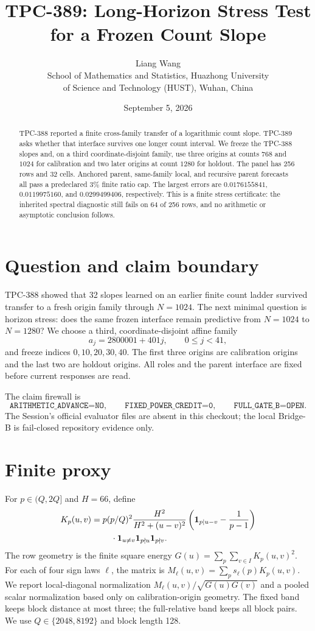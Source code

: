 \documentclass[10pt]{article}
\title{TPC-389: Long-Horizon Stress Test for a Frozen Count Slope}
\author{Liang Wang\\
School of Mathematics and Statistics, Huazhong University\\
of Science and Technology (HUST), Wuhan, China}
\date{September 5, 2026}
\begin{document}
\maketitle

\begin{abstract}
TPC-388 reported a finite cross-family transfer of a logarithmic count slope.
TPC-389 asks whether that interface survives one longer count interval.  We
freeze the TPC-388 slopes and, on a third coordinate-disjoint family, use
three origins at counts $768$ and $1024$ for calibration and two later origins
at count $1280$ for holdout.  The panel has 256 rows and 32 cells.  Anchored
parent, same-family local, and recursive parent forecasts all pass a
predeclared 3\% finite ratio cap.  The largest errors are
$0.0176155841$, $0.0119975160$, and $0.0299499406$, respectively.  This is a
finite stress certificate: the inherited spectral diagnostic still fails on
64 of 256 rows, and no arithmetic or asymptotic conclusion follows.
\end{abstract}

\section{Question and claim boundary}

TPC-388 showed that 32 slopes learned on an earlier finite count ladder
survived transfer to a fresh origin family through $N=1024$.  The next minimal
question is horizon stress: does the same frozen interface remain predictive
from $N=1024$ to $N=1280$?  We choose a third, coordinate-disjoint affine
family
\[
 a_j=2800001+401j,\qquad 0\leq j<41,
\]
and freeze indices $0,10,20,30,40$.  The first three origins are calibration
origins and the last two are holdout origins.  All roles and the parent
interface are fixed before current responses are read.

The claim firewall is
\[
 \texttt{ARITHMETIC\_ADVANCE=NO},\qquad
 \texttt{FIXED\_POWER\_CREDIT=0},\qquad
 \texttt{FULL\_GATE\_B=OPEN}.
\]
The Session's official evaluator files are absent in this checkout; the local
Bridge-B is fail-closed repository evidence only.

\section{Finite proxy}

For $p\in(Q,2Q]$ and $H=66$, define
\begin{align*}
 K_p(u,v)={}&p(p/Q)^2\frac{H^2}{H^2+(u-v)^2}
 \left({\bf 1}_{p\mid u-v}-\frac{1}{p-1}\right)\\
 &\quad\cdot{\bf 1}_{u\ne v}{\bf 1}_{p\nmid u}{\bf 1}_{p\nmid v}.
\end{align*}
The row geometry is the finite square energy
$G(u)=\sum_{p}\sum_{v\in I}K_p(u,v)^2$.  For each of four sign laws
$\ell$, the matrix is $M_\ell(u,v)=\sum_p s_\ell(p)K_p(u,v)$.  We report
local-diagonal normalization
$M_\ell(u,v)/\sqrt{G(u)G(v)}$ and a pooled scalar normalization based only on
calibration-origin geometry.  The fixed band keeps block distance at most
three; the full-relative band keeps all block pairs.  We use
$Q\in\{2048,8192\}$ and block length 128.
\end{document}
